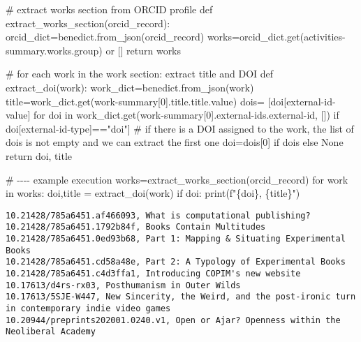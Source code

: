 \documentclass[
  letterpaper,
  DIV=11,
  numbers=noendperiod]{scrreprt}
\newenvironment{Shaded}{\begin{snugshade}}{\end{snugshade}}
\newcommand{\BuiltInTok}[1]{\textcolor[rgb]{0.00,0.23,0.31}{#1}}
\newcommand{\CommentTok}[1]{\textcolor[rgb]{0.37,0.37,0.37}{#1}}
\newcommand{\ControlFlowTok}[1]{\textcolor[rgb]{0.00,0.23,0.31}{#1}}
\newcommand{\DecValTok}[1]{\textcolor[rgb]{0.68,0.00,0.00}{#1}}
\newcommand{\KeywordTok}[1]{\textcolor[rgb]{0.00,0.23,0.31}{#1}}
\newcommand{\NormalTok}[1]{\textcolor[rgb]{0.00,0.23,0.31}{#1}}
\newcommand{\OperatorTok}[1]{\textcolor[rgb]{0.37,0.37,0.37}{#1}}
\newcommand{\SpecialCharTok}[1]{\textcolor[rgb]{0.37,0.37,0.37}{#1}}
\newcommand{\SpecialStringTok}[1]{\textcolor[rgb]{0.13,0.47,0.30}{#1}}
\newcommand{\StringTok}[1]{\textcolor[rgb]{0.13,0.47,0.30}{#1}}
\newcommand{\VariableTok}[1]{\textcolor[rgb]{0.07,0.07,0.07}{#1}}
\begin{document}
\begin{Shaded}
\begin{Highlighting}[]
\CommentTok{\# extract works section from ORCID profile}
\KeywordTok{def}\NormalTok{ extract\_works\_section(orcid\_record):}
\NormalTok{    orcid\_dict}\OperatorTok{=}\NormalTok{benedict.from\_json(orcid\_record)}
\NormalTok{    works}\OperatorTok{=}\NormalTok{orcid\_dict.get(}\StringTok{\textquotesingle{}activities{-}summary.works.group\textquotesingle{}}\NormalTok{) }\KeywordTok{or}\NormalTok{ []}
    \ControlFlowTok{return}\NormalTok{ works}

\CommentTok{\# for each work in the work section: extract title and DOI}
\KeywordTok{def}\NormalTok{ extract\_doi(work):}
\NormalTok{    work\_dict}\OperatorTok{=}\NormalTok{benedict.from\_json(work)}
\NormalTok{    title}\OperatorTok{=}\NormalTok{work\_dict.get(}\StringTok{\textquotesingle{}work{-}summary[0].title.title.value\textquotesingle{}}\NormalTok{)}
\NormalTok{    dois}\OperatorTok{=}\NormalTok{ [doi[}\StringTok{\textquotesingle{}external{-}id{-}value\textquotesingle{}}\NormalTok{] }\ControlFlowTok{for}\NormalTok{ doi }\KeywordTok{in}\NormalTok{ work\_dict.get(}\StringTok{\textquotesingle{}work{-}summary[0].external{-}ids.external{-}id\textquotesingle{}}\NormalTok{, []) }\ControlFlowTok{if}\NormalTok{ doi[}\StringTok{\textquotesingle{}external{-}id{-}type\textquotesingle{}}\NormalTok{]}\OperatorTok{==}\StringTok{"doi"}\NormalTok{]}
    \CommentTok{\# if there is a DOI assigned to the work, the list of dois is not empty and we can extract the first one}
\NormalTok{    doi}\OperatorTok{=}\NormalTok{dois[}\DecValTok{0}\NormalTok{] }\ControlFlowTok{if}\NormalTok{ dois }\ControlFlowTok{else} \VariableTok{None}
    \ControlFlowTok{return}\NormalTok{ doi, title}


\CommentTok{\# {-}{-}{-}{-} example execution}
\NormalTok{works}\OperatorTok{=}\NormalTok{extract\_works\_section(orcid\_record)}
\ControlFlowTok{for}\NormalTok{ work }\KeywordTok{in}\NormalTok{ works:}
\NormalTok{    doi,title }\OperatorTok{=}\NormalTok{ extract\_doi(work)}
    \ControlFlowTok{if}\NormalTok{ doi:}
        \BuiltInTok{print}\NormalTok{(}\SpecialStringTok{f"}\SpecialCharTok{\{}\NormalTok{doi}\SpecialCharTok{\}}\SpecialStringTok{, }\SpecialCharTok{\{}\NormalTok{title}\SpecialCharTok{\}}\SpecialStringTok{"}\NormalTok{)}
\end{Highlighting}
\end{Shaded}

\begin{verbatim}
10.21428/785a6451.af466093, What is computational publishing?
10.21428/785a6451.1792b84f, Books Contain Multitudes
10.21428/785a6451.0ed93b68, Part 1: Mapping & Situating Experimental Books
10.21428/785a6451.cd58a48e, Part 2: A Typology of Experimental Books
10.21428/785a6451.c4d3ffa1, Introducing COPIM's new website
10.17613/d4rs-rx03, Posthumanism in Outer Wilds
10.17613/5SJE-W447, New Sincerity, the Weird, and the post-ironic turn in contemporary indie video games
10.20944/preprints202001.0240.v1, Open or Ajar? Openness within the Neoliberal Academy
\end{verbatim}
\end{document}
